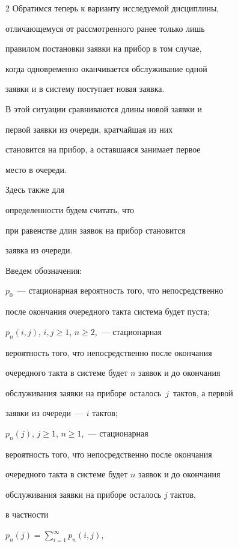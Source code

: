 \begin{multicols}{2}
Обратимся теперь к варианту исследуемой дисциплины,


отличающемуся от рассмотренного ранее только лишь


правилом постановки заявки на прибор в том случае,


когда одновременно оканчивается обслуживание одной


заявки и в систему поступает новая заявка.


В этой ситуации сравниваются длины новой заявки и


первой заявки из очереди, кратчайшая из них


становится на прибор, а оставшаяся занимает первое


место в очереди.


Здесь также для


 определенности будем считать, что


при равенстве длин заявок на прибор становится


заявка из оче\-реди.





Введем обозначения:





$p_{0}$~--- стационарная вероятность того, что непосредственно


после окончания очередного такта система будет пуста;





$p_{n}(i,j)$, $i,j\ge 1$, $n\ge 2$,~--- стационарная


вероятность того, что непосредственно после окончания


очередного такта в системе будет $n$ заявок и до окончания


обслуживания заявки на приборе осталось~$j$~тактов, а первой


заявки из очереди~--- $i$ тактов;





$p_{n}(j)$, $j\ge 1$, $n\ge 1$,~--- стационарная


вероятность того, что непосредственно после окончания


очередного такта в системе будет $n$ заявок и до окончания


обслуживания заявки на приборе осталось $j$ тактов,


в частности


$p_{n}(j) = \sum\limits_{i=1}^\infty p_{n}(i,j)$,



\end{multicols}
